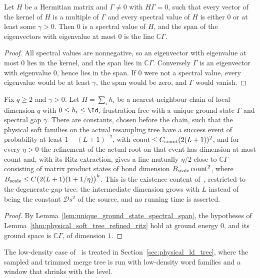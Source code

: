 \begin{lemma}
    \label{lem:unique_ground_state_spectral_span}
    \leanok
    Let $H$ be a Hermitian matrix and $\Gamma\ne0$ with $H\Gamma=0$, such
    that every vector of the kernel of $H$ is a multiple of $\Gamma$ and every
    spectral value of $H$ is either $0$ or at least some $\gamma>0$. Then $0$
    is a spectral value of $H$, and the span of the eigenvectors with
    eigenvalue at most $0$ is the line $\mathbb C\Gamma$.
\end{lemma}
\begin{proof}\leanok
    All spectral values are nonnegative, so an eigenvector with eigenvalue at
    most $0$ lies in the kernel, and the span lies in $\mathbb C\Gamma$.
    Conversely $\Gamma$ is an eigenvector with eigenvalue $0$, hence lies in
    the span. If $0$ were not a spectral value, every eigenvalue would be at
    least $\gamma$, the span would be zero, and $\Gamma$ would vanish.
\end{proof}

\begin{lemma}
    \label{thm:unique_ground_state_refined_ritz}
    \leanok
    Fix $q\ge2$ and $\gamma>0$. Let $H=\sum_ih_i$ be a nearest-neighbour
    chain of local dimension $q$ with $0\le h_i\le\Id$, frustration free with
    a unique ground state $\Gamma$ and spectral gap $\gamma$. There are
    constants, chosen before the chain, such that the physical soft families on
    the actual resampling tree have a success event of probability at least
    $1-(L+1)^{-2}$, with $\mathrm{count}\le C_{\rm count}(2(L+1))^2$, and for
    every $\eta>0$ the refinement of the actual root on that event has
    dimension at most $\mathrm{count}$ and, with its Ritz extraction, gives a
    line mutually $\eta/2$-close to $\mathbb C\Gamma$ consisting of
    matrix product states of bond dimension
    $B_{\rm scale}\,\mathrm{count}^2$, where
    $B_{\rm scale}\le C\bigl(2(L+1)(1+1/\eta)\bigr)^k$. This is the existence
    content of~\cite[Theorem~\texttt{t:unique}, lines
        1829--1855]{Arad2016RigorousRG}, restricted to the degenerate-gap tree:
    the intermediate dimension grows with $L$ instead of being the constant
    $\mathcal D s^2$ of the source, and no running time is asserted.
\end{lemma}
\begin{proof}\leanok
    By Lemma~\ref{lem:unique_ground_state_spectral_span}, the hypotheses of
    Lemma~\ref{thm:physical_soft_tree_refined_ritz} hold at ground energy
    $0$, and its ground space is $\mathbb C\Gamma$, of dimension $1$.
\end{proof}

The low-density case of~\cite[Theorem~\texttt{t:alg2}, lines
    1869--1878]{Arad2016RigorousRG} is treated in
Section~\ref{sec:physical_ld_tree}, where the sampled and trimmed merge tree
is run with low-density word families and a window that shrinks with the
level.
